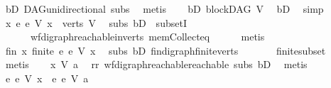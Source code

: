 \begin{isabellebody}
\ bD\ DAG{\isachardot}{\kern0pt}unidirectional\ subs\ \isamarkupfalse%
\ metis\isanewline
\ \ \isamarkupfalse%
\ bD{}{\isacharcolon}{\kern0pt}\ {\isachardoublequoteopen}blockDAG\ V{\isachardoublequoteclose}\ \isamarkupfalse%
\ bD\ \isamarkupfalse%
\ simp\isanewline
\ \ \isamarkupfalse%
\ {\isachardoublequoteopen}{\isasymforall}x{\isachardot}{\kern0pt}\ {\isacharbraceleft}{\kern0pt}e{\isachardot}{\kern0pt}\ e\ {\isasymrightarrow}\isactrlsup {\isacharasterisk}{\kern0pt}\isactrlbsub V\isactrlesub \ x{\isacharbraceright}{\kern0pt}\ {\isasymsubseteq}\ verts\ V{\isachardoublequoteclose}\ \isamarkupfalse%
\ subs\ bD{}\ \ subsetI\isanewline
\ \ \ \ \ \ wf{\isacharunderscore}{\kern0pt}digraph{\isachardot}{\kern0pt}reachable{\isacharunderscore}{\kern0pt}in{\isacharunderscore}{\kern0pt}verts{\isacharparenleft}{\kern0pt}{}{\isacharparenright}{\kern0pt}\ mem{\isacharunderscore}{\kern0pt}Collect{\isacharunderscore}{\kern0pt}eq\isanewline
\ \ \ \ \isamarkupfalse%
\ metis\ \isanewline
\ \ \isamarkupfalse%
\ \isamarkupfalse%
\ fin{\isacharcolon}{\kern0pt}\ {\isachardoublequoteopen}{\isasymforall}x{\isachardot}{\kern0pt}\ finite\ {\isacharbraceleft}{\kern0pt}e{\isachardot}{\kern0pt}\ e\ {\isasymrightarrow}\isactrlsup {\isacharasterisk}{\kern0pt}\isactrlbsub V\isactrlesub \ x{\isacharbraceright}{\kern0pt}{\isachardoublequoteclose}\ \isamarkupfalse%
\ subs\ bD{}\ fin{\isacharunderscore}{\kern0pt}digraph{\isachardot}{\kern0pt}finite{\isacharunderscore}{\kern0pt}verts\ \isanewline
\ \ \ \ \ \ finite{\isacharunderscore}{\kern0pt}subset\isanewline
\ \ \ \ \isamarkupfalse%
\ metis\isanewline
\ \ \isamarkupfalse%
\ {\isachardoublequoteopen}x\ {\isasymrightarrow}\isactrlsup {\isacharasterisk}{\kern0pt}\isactrlbsub V\isactrlesub \ a{\isachardoublequoteclose}\ \isamarkupfalse%
\ rr\ wf{\isacharunderscore}{\kern0pt}digraph{\isachardot}{\kern0pt}reachable{}{\isacharunderscore}{\kern0pt}reachable\ subs\ bD{}\ \isamarkupfalse%
\ metis\isanewline
\ \ \isamarkupfalse%
\ \isamarkupfalse%
\ {\isachardoublequoteopen}{\isacharbraceleft}{\kern0pt}e{\isachardot}{\kern0pt}\ e\ {\isasymrightarrow}\isactrlsup {\isacharasterisk}{\kern0pt}\isactrlbsub V\isactrlesub \ x{\isacharbraceright}{\kern0pt}\ {\isasymsubseteq}\ {\isacharbraceleft}{\kern0pt}e{\isachardot}{\kern0pt}\ e\ {\isasymrightarrow}\isactrlsup {\isacharasterisk}{\kern0pt}\isactrlbsub V\isactrlesub \ a{\isacharbraceright}{\kern0pt}{\isachardoublequoteclose}\ \isamarkupfalse%

\end{isabellebody}
